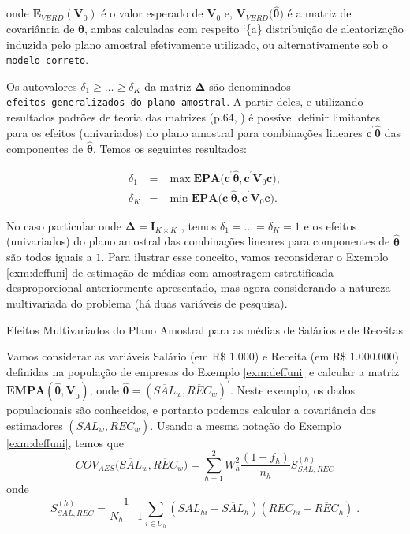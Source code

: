 \documentclass[]{book}
\theoremstyle{definition}
\theoremstyle{definition}
\theoremstyle{definition}
\theoremstyle{remark}
\let\BeginKnitrBlock\begin \let\EndKnitrBlock\end
\begin{document}
onde \(\mathbf{E}_{VERD}\left( \mathbf{V}_{0}\right)\) é o valor
esperado de \(\mathbf{V}_{0}\) e,
\(\mathbf{V}_{VERD}(\mathbf{\hat{\theta})}\) é a matriz de covariância
de \(\mathbf{\hat{\theta}}\), ambas calculadas com respeito `\{a\}
distribuição de aleatorização induzida pelo plano amostral efetivamente
utilizado, ou alternativamente sob o \texttt{modelo\ correto}.

Os autovalores \(\delta _{1}\geq \ldots \geq \delta _{K}\) da matriz
\(\mathbf{\Delta }\) são denominados
\texttt{efeitos\ generalizados\ do\ plano\ amostral}. A partir deles, e
utilizando resultados padrões de teoria das matrizes (p.64,
\citep{Johnson}) é possível definir limitantes para os efeitos
(univariados) do plano amostral para combinações lineares
\(\mathbf{c}^{^{\prime }}\widehat{\mathbf{\theta }}\) das componentes de
\(\widehat{\mathbf{\theta }}\). Temos os seguintes resultados:

\begin{eqnarray*}
\delta _{1} &=&\max \mathbf{EPA}(\mathbf{c}^{^{\prime }}\widehat{\mathbf{
\theta }}\mathbf{,c}^{^{\prime }}\mathbf{V}_{0}\mathbf{c)}, \\
\delta _{K} &=&\min \mathbf{EPA}(\mathbf{c}^{^{\prime }}\widehat{\mathbf{\theta }}\mathbf{,c}^{^{\prime }}\mathbf{V}_{0}\mathbf{c)}.
\end{eqnarray*}

No caso particular onde \(\mathbf{\Delta =I}_{K\times K}\) , temos
\(\delta_{1}=\ldots =\delta _{K}=1\) e os efeitos (univariados) do plano
amostral das combinações lineares para componentes de
\(\mathbf{\hat{\theta}}\) são todos iguais a \(1\). Para ilustrar esse
conceito, vamos reconsiderar o Exemplo \ref{exm:deffuni} de estimação de
médias com amostragem estratificada desproporcional anteriormente
apresentado, mas agora considerando a natureza multivariada do problema
(há duas variáveis de pesquisa).

\BeginKnitrBlock{example}
\protect\hypertarget{exm:deffmult}{}{\label{exm:deffmult} }Efeitos
Multivariados do Plano Amostral para as médias de Salários e de Receitas
\EndKnitrBlock{example}

Vamos considerar as variáveis Salário (em R\$ \(1.000\)) e Receita (em
R\$ \(1.000.000\)) definidas na população de empresas do Exemplo
\ref{exm:deffuni} e calcular a matriz
\(\mathbf{EMPA}\left( \mathbf{\hat{\theta},V}_{0}\right)\), onde
\(\mathbf{\hat{\theta}=}\left( \overline{SAL}_{w},\overline{REC}_{w}\right) ^{\prime }\).
Neste exemplo, os dados populacionais são conhecidos, e portanto podemos
calcular a covariância dos estimadores
\(\left( \overline{SAL}_{w},\overline{REC}_{w}\right)\). Usando a mesma
notação do Exemplo \ref{exm:deffuni}, temos que \[
COV_{AES}(\overline{SAL}_{w},\overline{REC}_{w}\mathbf{)=}\sum\limits_{h=1}^{2}W_{h}^{2}\frac{\left( 1-f_{h}\right) }{n_{h}}S_{SAL,REC}^{\left( h\right) } 
\] onde \[
S_{SAL,REC}^{\left( h\right) }=\frac{1}{N_{h}-1}\sum\limits_{i\in
U_{h}}\left( SAL_{hi}-\overline{SAL}_{h}\right) \left( REC_{hi}-\overline{REC
}_{h}\right) \;. 
\]
\end{document}
